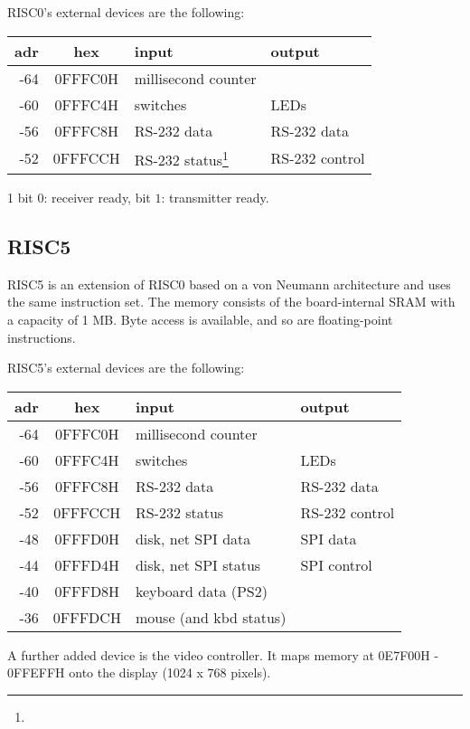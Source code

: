 RISC0's external devices are the following:
\begin{table}[h!]
  \centering
  \begin{tabular}{r c l l}
    adr &   hex   & input               & output \\\hline
    -64 & 0FFFC0H & millisecond counter & \\
    -60 & 0FFFC4H & switches            & LEDs \\
    -56 & 0FFFC8H & RS-232 data         & RS-232 data \\
    -52 & 0FFFCCH & RS-232 status\footnote{}
                                        & RS-232 control
  \end{tabular}
\end{table}

{\footnotesize 1 bit $0$: receiver ready,
                 bit $1$: transmitter ready.}

\subsection{RISC5}
RISC5 is an extension of RISC0 based on a von Neumann architecture and uses the same instruction set. The memory
consists of the board-internal SRAM with a capacity of 1 MB. Byte access is available, and so are floating-point
instructions.

RISC5's external devices are the following:
\begin{table}[h!]
  \centering
  \begin{tabular}{r c l l}
    adr &   hex   & input                & output \\\hline
    -64 & 0FFFC0H & millisecond counter  \\
    -60 & 0FFFC4H & switches             & LEDs \\
    -56 & 0FFFC8H & RS-232 data          & RS-232 data \\
    -52 & 0FFFCCH & RS-232 status        & RS-232 control \\
    -48 & 0FFFD0H & disk, net SPI data   & SPI data \\
    -44 & 0FFFD4H & disk, net SPI status & SPI control \\
    -40 & 0FFFD8H & keyboard data (PS2) \\
    -36 & 0FFFDCH & mouse (and kbd status)
  \end{tabular}
\end{table}

A further added device is the video controller. It maps memory at 0E7F00H - 0FFEFFH onto the display (1024 x 768
pixels).
